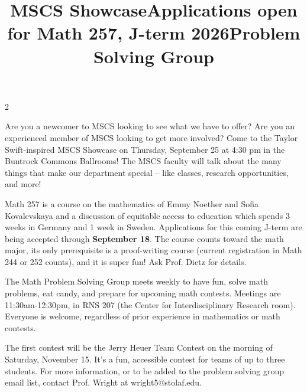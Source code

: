 \documentclass[12pt]{article}
\newcommand{\bolder}{\textbf}
\begin{document}
 \begin{multicols}{2}

\begin{tcolorbox}[colback=white, colframe=black]
    \begin{center}
    \title{{\large \bolder{MSCS Showcase}}}
    \end{center}
\end{tcolorbox}

Are you a newcomer to MSCS looking to see what we have to offer? Are you an experienced member of MSCS looking to get more involved? Come to the Taylor Swift-inspired  MSCS Showcase on Thursday, September 25 at 4:30 pm in the Buntrock Commons Ballrooms! The MSCS faculty will talk about the many things that make our department special – like classes, research opportunities, and more!
 

\begin{tcolorbox}[colback=white, colframe=black]
    \begin{center}
    \title{{\large \bolder{Applications open for Math 257, J-term 2026}}}
    \end{center}
\end{tcolorbox}

Math 257 is a course on the mathematics of Emmy Noether and Sofia Kovalevskaya and a discussion of equitable access to education which spends 3 weeks in Germany and 1 week in Sweden. Applications for this coming J-term are being accepted through \textbf{September 18}. The course counts toward the math major, its only prerequisite is a proof-writing course (current registration in Math 244 or 252 counts), and it is super fun! Ask Prof. Dietz for details.





\begin{tcolorbox}[colback=white, colframe=black]
    \begin{center}
    \title{{\large \bolder{Problem Solving Group}}}
    \end{center}
\end{tcolorbox}
The Math Problem Solving Group meets weekly to have fun, solve math problems, eat candy, and prepare for upcoming math contests. Meetings are 11:30am-12:30pm, in RNS 207 (the Center for Interdisciplinary Research room). Everyone is welcome, regardless of prior experience in mathematics or math contests.

The first contest will be the Jerry Heuer Team Contest on the morning of Saturday, November 15. It's a fun, accessible contest for teams of up to three students. For more information, or to be added to the problem solving group email list, contact Prof. Wright at wright5@stolaf.edu.



\end{multicols}
\end{document}
